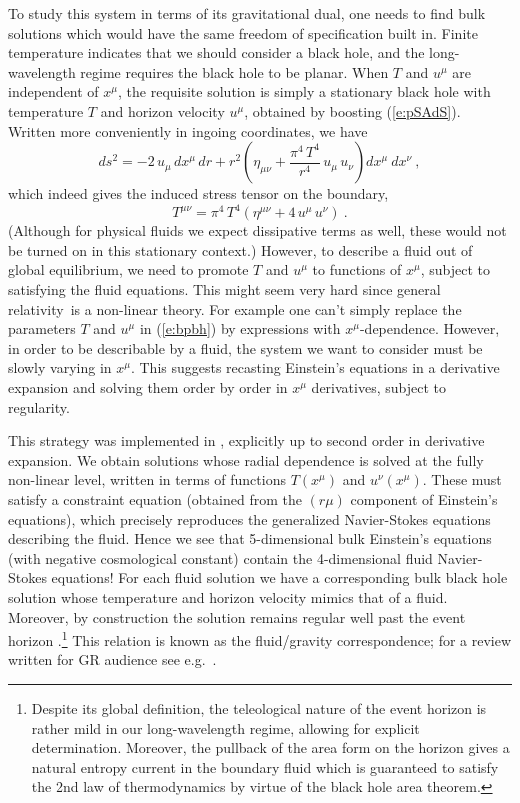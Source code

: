 \documentclass[12pt]{article}
\def\req#1{(\ref{#1})}
\def\GR{general relativity}
\begin{document}
 To study this system in terms of its gravitational dual, one needs to find  bulk solutions which would have the same freedom of specification built in.  Finite temperature indicates that we should consider a black hole, and the long-wavelength regime requires the black hole to be planar.  When $T$ and $u^\mu$ are independent of $x^\mu$, the requisite solution is simply a stationary black hole with temperature $T$ and horizon velocity $u^\mu$, obtained by boosting \req{e:pSAdS}.  Written more conveniently in ingoing coordinates, we have
\begin{equation}
ds^2 = -2 \, u_\mu \, dx^\mu \, dr + r^2 \left(\eta_{\mu\nu} +\frac{\pi^4 \, T^4}{r^4} \, u_\mu \, u_\nu \right) dx^\mu \ dx^\nu \ ,
\label{e:bpbh}
\end{equation}	
%
 which indeed gives the induced stress tensor on the boundary,
\begin{equation}
T^{\mu\nu} = \pi^4 \, T^4 \left( \eta^{\mu\nu} + 4 \, u^\mu \, u^\nu \right)
\ .
\label{}
\end{equation}	
%
(Although for physical fluids we expect dissipative terms as well, these would not be turned on in this stationary context.)
However, to describe a fluid out of global equilibrium, we need to promote $T$ and $u^\mu$ to functions of $x^\mu$, subject to satisfying the fluid equations.  This might seem very hard since \GR\ is a non-linear theory.  For example one can't simply replace  the parameters $T$ and  $u^\mu$ in \req{e:bpbh} by expressions with $x^\mu$-dependence.  However, in order to be describable by a fluid, the system we want to consider must be slowly varying in $x^\mu$.  This suggests recasting Einstein's equations in a derivative expansion and solving them order by order in $x^{\mu}$ derivatives, subject to regularity.  

This strategy was implemented  in  \cite{Bhattacharyya:2008jc}, explicitly up to second order in derivative expansion.  We obtain solutions whose radial dependence is solved at the fully non-linear level, written in terms of functions $T(x^\mu)$ and $u^\nu(x^\mu)$.  These must satisfy a constraint equation (obtained from the $(r \mu)$ component of Einstein's equations), which precisely reproduces the generalized Navier-Stokes equations describing the fluid.  Hence we see that 5-dimensional bulk Einstein's equations (with negative cosmological constant) contain the 4-dimensional fluid Navier-Stokes equations!  For each fluid solution we  have  a corresponding bulk black hole solution whose temperature and  horizon velocity mimics that of a fluid.  Moreover, by construction the solution remains regular well past the event horizon \cite{Bhattacharyya:2008xc}.\footnote{
Despite its global definition, the teleological nature of the event horizon is rather mild in our long-wavelength regime, allowing for explicit determination.  Moreover, the pullback of the area form on the horizon gives a natural entropy current in the boundary fluid which is guaranteed to  satisfy the 2nd law of thermodynamics by virtue of the black hole area theorem.
}  This relation is known as the fluid/gravity correspondence; for a review written for GR audience see e.g.\ \cite{Hubeny:2011hd,Hubeny:2010wp}.
\end{document}
